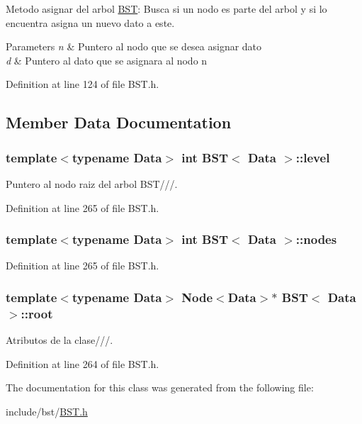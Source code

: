 Metodo asignar del arbol \hyperlink{class_b_s_t}{B\+S\+T}\+: Busca si un nodo es parte del arbol y si lo encuentra asigna un nuevo dato a este. 


\begin{DoxyParams}{Parameters}
{\em n} & Puntero al nodo que se desea asignar dato \\
\hline
{\em d} & Puntero al dato que se asignara al nodo n \\
\hline
\end{DoxyParams}


Definition at line 124 of file B\+S\+T.\+h.



\subsection{Member Data Documentation}
\hypertarget{class_b_s_t_ab7d2c494210429a912857968faabbcf5}{
\subsubsection[{level}]{\setlength{\rightskip}{0pt plus 5cm}template$<$typename Data$>$ int {\bf B\+S\+T}$<$ {\bf Data} $>$\+::level}}\label{class_b_s_t_ab7d2c494210429a912857968faabbcf5}


Puntero al nodo raiz del arbol B\+S\+T///. 



Definition at line 265 of file B\+S\+T.\+h.

\hypertarget{class_b_s_t_adc23f51220d43a63e6b34a80fc9e6932}{
\subsubsection[{nodes}]{\setlength{\rightskip}{0pt plus 5cm}template$<$typename Data$>$ int {\bf B\+S\+T}$<$ {\bf Data} $>$\+::nodes}}\label{class_b_s_t_adc23f51220d43a63e6b34a80fc9e6932}


Definition at line 265 of file B\+S\+T.\+h.

\hypertarget{class_b_s_t_ae9208b0d67c10cd0452bdef9b8fd2669}{
\subsubsection[{root}]{\setlength{\rightskip}{0pt plus 5cm}template$<$typename Data$>$ {\bf Node}$<${\bf Data}$>$$\ast$ {\bf B\+S\+T}$<$ {\bf Data} $>$\+::root}}\label{class_b_s_t_ae9208b0d67c10cd0452bdef9b8fd2669}


Atributos de la clase///. 



Definition at line 264 of file B\+S\+T.\+h.



The documentation for this class was generated from the following file\+:\begin{DoxyCompactItemize}
\item 
include/bst/\hyperlink{_b_s_t_8h}{B\+S\+T.\+h}\end{DoxyCompactItemize}
